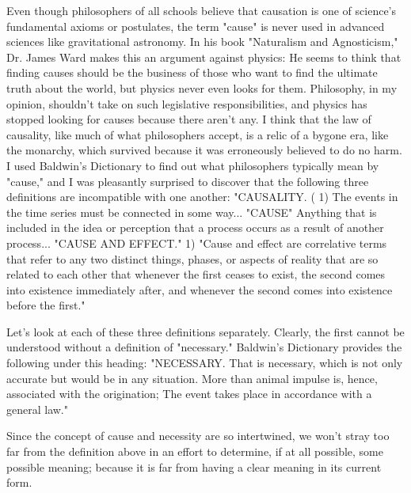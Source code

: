 \documentclass[a4paper,12pt]{book}[2004/02/16]
\theoremstyle{ilemma}
\theoremstyle{itheorem}
\theoremstyle{iother}
\theoremstyle{icorollary}
\theoremstyle{numcorollary}
\theoremstyle{idefinition}
\begin{document}
Even though philosophers of all schools believe that causation is one of science's fundamental axioms or postulates, the term "cause" is never used in advanced sciences like gravitational astronomy. In his book "Naturalism and Agnosticism," Dr. James Ward makes this an argument against physics: He seems to think that finding causes should be the business of those who want to find the ultimate truth about the world, but physics never even looks for them. Philosophy, in my opinion, shouldn't take on such legislative responsibilities, and physics has stopped looking for causes because there aren't any.
I think that the law of causality, like much of what philosophers accept, is a relic of a bygone era, like the monarchy, which survived because it was erroneously believed to do no harm. I used Baldwin's Dictionary to find out what philosophers typically mean by "cause," and I was pleasantly surprised to discover that the following three definitions are incompatible with one another: "CAUSALITY. ( 1) The events in the time series must be connected in some way... "CAUSE" Anything that is included in the idea or perception that a process occurs as a result of another process... "CAUSE AND EFFECT." 1) "Cause and effect are correlative terms that refer to any two distinct things, phases, or aspects of reality that are so related to each other that whenever the first ceases to exist, the second comes into existence immediately after, and whenever the second comes into existence before the first."

Let's look at each of these three definitions separately. Clearly, the first cannot be understood without a definition of "necessary." Baldwin's Dictionary provides the following under this heading: "NECESSARY. That is necessary, which is not only accurate but would be in any situation. More than animal
     impulse is, hence, associated with the origination; The event takes place in accordance with a general law."

Since the concept of cause and necessity are so intertwined, we won't stray too far from the definition above in an effort to determine, if at all possible, some possible meaning; because it is far from having a clear meaning in its current form.
\end{document}
